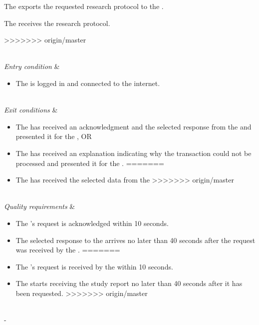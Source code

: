 \begin{table}[H]
\begin{tabu}
\begin{enumerate}[leftmargin=*,topsep=0pt,itemsep=-1ex]
{				\setlength{\itemindent}{2cm}
				\item \parbox[t]{\linewidth-\itemindent}{ The \server exports the requested research protocol to the \researcher.}
				\newline
		\item The \client receives the research protocol.
		}
			\newline
>>>>>>> origin/master
	\end{enumerate} \\
	\hline
	\textit{Entry condition} &
	\vspace{-3mm}
	\begin{itemize}[leftmargin=*,topsep=0pt,itemsep=-1ex]
		\item The \client is logged in and connected to the internet.
	\end{itemize} \\
	\hline
	\textit{Exit conditions} &
	\vspace{-3mm}
	\begin{itemize}[leftmargin=*,topsep=0pt,itemsep=-1ex]
<<<<<<< HEAD
		\item The \client has received an acknowledgment and the selected response from the \serverside and presented it for the \researcher, OR
		\item The \client has received an explanation indicating why the transaction could not be processed and presented it for the \researcher.
=======
		\item The \client has received the selected data from the \server
>>>>>>> origin/master
	\end{itemize} \\
	\hline
	\textit{Quality \newline requirements} &
	\vspace{-3mm}
	\begin{itemize}[leftmargin=*,topsep=0pt,itemsep=-1ex]
<<<<<<< HEAD
		\item The \researcher's request is acknowledged within 10 seconds.
		\item The selected response to the \client arrives no later than 40 seconds after the request was received by the \serverside.
=======
		\item The \client's request is received by the \server within 10 seconds.
		\item The \client  starts receiving the study report no later than 40 seconds after it has been requested.
>>>>>>> origin/master
	\end{itemize} \\
	\tabucline[1.5pt]-
\end{tabu}
\caption{Use case: ExportProtocol}
\label{uc:ExportProtocol}
\end{table}